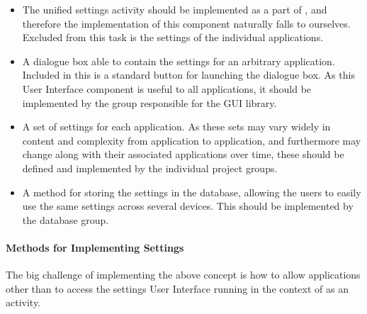 \begin{itemize}
	\item The unified settings activity should be implemented as a part of \launcher, and therefore the implementation of this component naturally falls to ourselves. 
	Excluded from this task is the settings of the individual applications.
	\item A dialogue box able to contain the settings for an arbitrary \giraf application. Included in this is a standard button for launching the dialogue box. 
	As this User Interface component is useful to all applications, it should be implemented by the group responsible for the \giraf GUI library.
	\item A set of settings for each \giraf application.
	As these sets may vary widely in content and complexity from application to application, and furthermore may change along with their associated applications over time, these should be defined and implemented by the individual project groups. 
	\item A method for storing the settings in the database, allowing the users to easily use the same settings across several devices. 
	This should be implemented by the database group. 
\end{itemize}


\paragraph{Methods for Implementing Settings}
The big challenge of implementing the above concept is how to allow applications other than \launcher to access the settings User Interface running in the context of \launcher as an activity.

